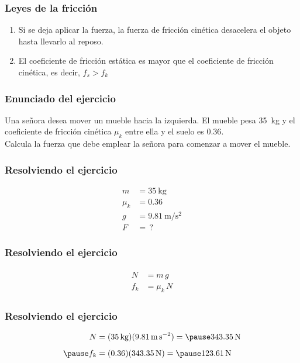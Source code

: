 \documentclass[14pt]{beamer}
\begin{document}
\begin{frame}
\frametitle{Leyes de la fricción}
\begin{enumerate}[<+->]
\conti
\item Si se deja aplicar la fuerza, la fuerza de fricción cinética desacelera el objeto hasta llevarlo al reposo.
\item El coeficiente de fricción estática es mayor que el coeficiente de fricción cinética, es decir, $f_{s} > f_{k}$
\end{enumerate}
\end{frame}
\begin{frame}
\frametitle{Enunciado del ejercicio}
Una señora desea mover un mueble hacia la izquierda. \pause El mueble pesa \SI{35}{\kilo\gram} y el coeficiente de fricción cinética $\mu_{k}$ entre ella y el suelo es $0.36$.
\\
\bigskip
\pause
Calcula la fuerza que debe emplear la señora para comenzar a mover el mueble.
\end{frame}
\begin{frame}
\frametitle{Resolviendo el ejercicio}
\pause
\begin{align*}
m &= \SI{35}{\kilo\gram} \\[0.2em]
\mu_{k} &= \num{0.36} \\[0.2em]
g &= \SI{9.81}{\meter\per\square\second} \\[0.2em]
F &= \, ?
\end{align*}
\end{frame}
\begin{frame}
\frametitle{Resolviendo el ejercicio}
\pause
\begin{eqnarray*}
\begin{aligned}
N &= m \, g \\[0.3em]
f_{k} &= \mu_{k} \, N
\end{aligned}
\end{eqnarray*}
\end{frame}
\begin{frame}
\frametitle{Resolviendo el ejercicio}
\begin{eqnarray*}
\begin{aligned}
N &= (\SI{35}{\kilo\gram})(\SI{9.81}{\meter\per\square\second}) = \pause \SI{343.35}{\newton} \\[0.5em] \pause
f_{k} &= (0.36)(\SI{343.35}{\newton}) = \pause \SI{123.61}{\newton}
\end{aligned}
\end{eqnarray*}
\end{frame}
\end{document}
